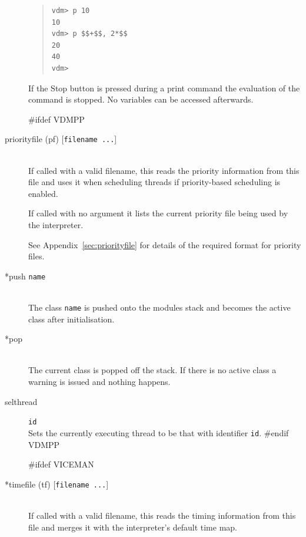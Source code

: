 \documentclass[\pformat,12pt]{article}
\newcommand{\guicmd}[1]{{\sf #1}}
\newcommand{\guicmd}[1]{{\gt #1}}
\begin{document}
\begin{description}
\begin{quote}
\begin{verbatim}
vdm> p 10
10
vdm> p $$+$$, 2*$$
20
40
vdm> 
\end{verbatim}
\end{quote}

  If the \guicmd{Stop} button
  is pressed during a 
  print command the evaluation of the command is stopped. No variables
  can be accessed afterwards.
  
#ifdef VDMPP
\item[priorityfile (pf) \mbox{[{\tt filename ...}]}]
  \mbox{}\\
  If called with a valid filename, this reads the priority information
  from this file and uses it when scheduling threads if
  priority-based scheduling is enabled.

  If called with no argument it lists the current priority file being
  used by the interpreter.

  See Appendix~\ref{sec:priorityfile} for details of the required
  format for priority files.

\item[*push {\tt name}] \mbox{}\\
  The class {\tt name}\/ is pushed onto the modules stack and becomes
  the active class after initialisation.
  
\item[*pop] \mbox{}\\
  The current class is popped off the stack. 
If there is no active class a warning is issued and
  nothing happens.

\item[selthread]\texttt{id}\mbox{}\\
  Sets the currently executing thread to be that with identifier
  \texttt{id}.
#endif VDMPP

#ifdef VICEMAN
\item[*timefile (tf) \mbox{[{\tt filename ...}]}] \mbox{}\\
  If called with a valid filename, this reads the timing information
  from this file and merges it with the interpreter's default time
  map.


\end{description}
\end{document}
